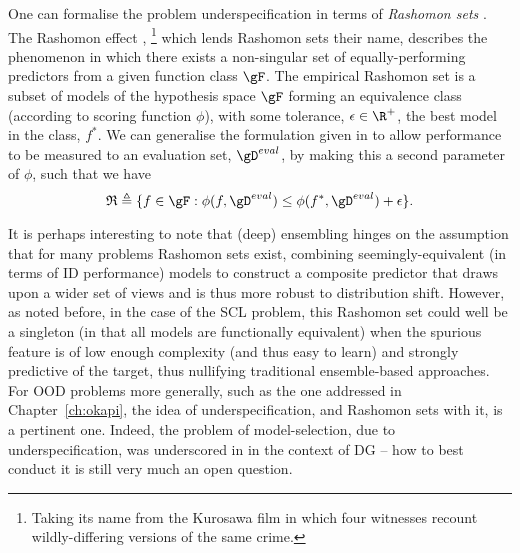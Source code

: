 %
One can formalise the problem underspecification in terms of \emph{Rashomon sets}
\citep{semenova2019study}.
The Rashomon effect \citep{breiman2001statistical},
%
\footnote{
  Taking its name from the Kurosawa film in which four witnesses recount wildly-differing versions
  of the same crime.
%
}
%
which lends Rashomon sets their name, describes the phenomenon in which there exists a
non-singular set of equally-performing predictors from a given function class $\gF$.
%
 The empirical Rashomon set is a subset of models of the hypothesis space $\gF$ forming an
 equivalence class (according to scoring function $\phi$), with some tolerance, $\epsilon \in \R^+$, \wrt{}
 the best model in the class, $f^\ast$. 
%
We can generalise the formulation given in \citet{semenova2019study} to allow performance to be
measured \wrt{} to an evaluation set,  $\gD^{eval}$, by making this a second parameter of
$\phi$, such that we have
%
\begin{equation*}
  \mathfrak{R} \triangleq 
  \{ 
    f \in \gF: \phi(f, \gD^{eval}) 
    \leq 
    \phi( f^\ast, \gD^{eval} ) + \epsilon 
  \}.
\end{equation*}

It is perhaps interesting to note that (deep) ensembling hinges on the assumption that for many
problems Rashomon sets exist, combining seemingly-equivalent (in terms of \ac{ID} performance)
models to construct a composite predictor that draws upon a wider set of views and is thus more
robust to distribution shift.
%
However, as noted before, in the case of the \ac{SCL} problem, this Rashomon set could well be a
singleton (in that all models are functionally equivalent) when the spurious feature is of low
enough complexity (and thus easy to learn) and strongly predictive of the target, thus nullifying
traditional ensemble-based approaches.
%
For \ac{OOD} problems more generally, such as the one addressed in Chapter~\ref{ch:okapi}, the idea
of underspecification, and Rashomon sets with it, is a pertinent one.
%
Indeed, the problem of model-selection, due to underspecification, was underscored in
\citet{gulrajani2020search} in the context of \ac{DG} -- how to best conduct it is still very much
an open question.

